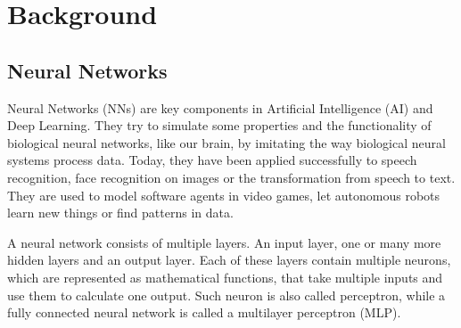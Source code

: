 \chapter{Background}

  \section{Neural Networks}

    Neural Networks (NNs) are key components in Artificial Intelligence (AI) and Deep Learning.
    They try to simulate some properties and the functionality of biological neural networks, like our brain, by imitating the way biological neural systems process data.
    Today, they have been applied successfully to speech recognition, face recognition on images or the transformation from speech to text.
    They are used to model software agents in video games, let autonomous robots learn new things or find patterns in data.

    A neural network consists of multiple layers.
    An input layer, one or many more hidden layers and an output layer.
    Each of these layers contain multiple neurons, which are represented as mathematical functions, that take multiple inputs and use them to calculate one output.
    Such neuron is also called perceptron, while a fully connected neural network is called a multilayer perceptron (MLP).

